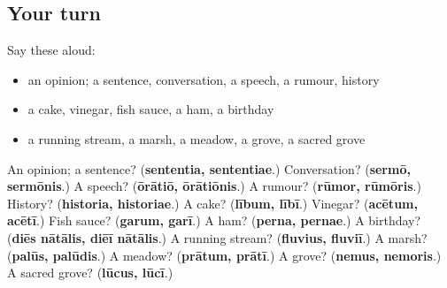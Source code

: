 \subsection*{Your turn}
Say these aloud:

\begin{itemize}
\raggedright
  \item an opinion; a sentence, conversation, a speech, a rumour, history
  \item a cake, vinegar, fish sauce, a ham, a birthday
  \item a running stream, a marsh, a meadow, a grove, a sacred grove
\end{itemize}

\begin{tcolorbox}[breakable,colback=teal!4,colframe=teal!35!black,title={Before you move on}]
An opinion; a sentence? (\textbf{sententia, sententiae}.) Conversation? (\textbf{sermō, sermōnis}.) A speech? (\textbf{ōrātiō, ōrātiōnis}.) A rumour? (\textbf{rūmor, rūmōris}.) History? (\textbf{historia, historiae}.) A cake? (\textbf{lībum, lībī}.) Vinegar? (\textbf{acētum, acētī}.) Fish sauce? (\textbf{garum, garī}.) A ham? (\textbf{perna, pernae}.) A birthday? (\textbf{diēs nātālis, diēī nātālis}.) A running stream? (\textbf{fluvius, fluviī}.) A marsh? (\textbf{palūs, palūdis}.) A meadow? (\textbf{prātum, prātī}.) A grove? (\textbf{nemus, nemoris}.) A sacred grove? (\textbf{lūcus, lūcī}.)
\end{tcolorbox}
